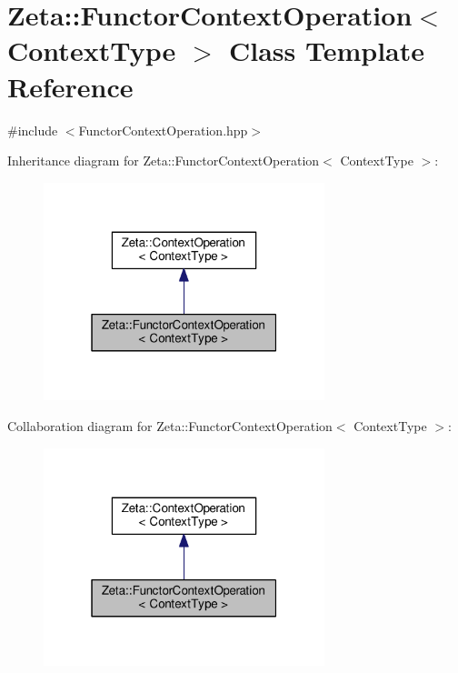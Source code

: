 \hypertarget{classZeta_1_1FunctorContextOperation}{\section{Zeta\+:\+:Functor\+Context\+Operation$<$ Context\+Type $>$ Class Template Reference}
\label{classZeta_1_1FunctorContextOperation}
}


{\ttfamily \#include $<$Functor\+Context\+Operation.\+hpp$>$}



Inheritance diagram for Zeta\+:\+:Functor\+Context\+Operation$<$ Context\+Type $>$\+:\nopagebreak
\begin{figure}[H]
\begin{center}
\leavevmode
\includegraphics[width=232pt]{classZeta_1_1FunctorContextOperation__inherit__graph}
\end{center}
\end{figure}


Collaboration diagram for Zeta\+:\+:Functor\+Context\+Operation$<$ Context\+Type $>$\+:\nopagebreak
\begin{figure}[H]
\begin{center}
\leavevmode
\includegraphics[width=232pt]{classZeta_1_1FunctorContextOperation__coll__graph}
\end{center}
\end{figure}
